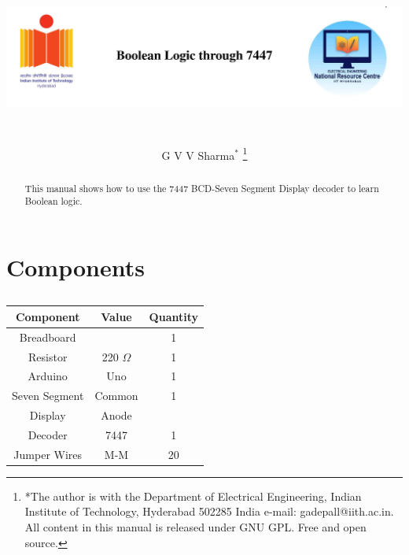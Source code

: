\documentclass[journal,12pt,twocolumn]{IEEEtran}
\begin{document}
	
	
	\title{
		
		
		\includegraphics[width=15cm, height=4cm]{title}
		\centering
		
	}
	\author{G V V Sharma$^{*}$%
		\thanks{*The author is with the Department
			of Electrical Engineering, Indian Institute of Technology, Hyderabad
			502285 India e-mail:  gadepall@iith.ac.in. All content in this manual is released under GNU GPL.  Free and open source.}}
	
	\maketitle
	\tableofcontents


\bigskip
%
\begin{abstract}
This manual shows how to use the 7447 BCD-Seven Segment Display decoder to learn Boolean logic.
\end{abstract}
\section{Components}

	\begin{table}[h!]
		\begin{center}
			\begin{tabular}{ |c|c|c| } 
				\hline
				\textbf{Component} & \textbf{Value} & \textbf{Quantity} \\ 
				\hline
				Breadboard &  & 1  \\ 
				\hline
				Resistor &  220 $\Omega$ & 1  \\ 
				\hline
				Arduino & Uno & 1  \\ 
				\hline
				Seven Segment & Common & 1 \\
				Display &  Anode &   \\
				\hline
			    Decoder & 7447 & 1  \\
				\hline
				Jumper Wires & M-M & 20  \\
				\hline
			\end{tabular}
			\caption{}
			\label{table:components}
		\end{center}
	\end{table}
\end{document}
